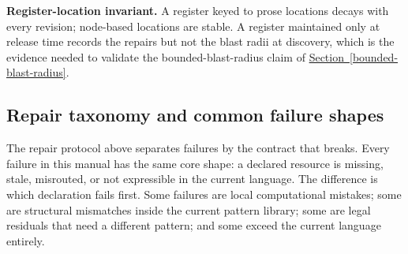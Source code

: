 \documentclass[
  11pt,
]{article}
\theoremstyle{definition}
\newcommand{\secref}[1]{\hyperref[#1]{Section~\ref*{#1}}}
\begin{document}
\textbf{Register-location invariant.} A register keyed to prose
locations decays with every revision; node-based locations are stable. A
register maintained only at release time records the repairs but not the
blast radii at discovery, which is the evidence needed to validate the
bounded-blast-radius claim of \secref{bounded-blast-radius}.



\subsection{Repair taxonomy and common failure shapes}\label{repair-taxonomy-and-common-failure-shapes}

The repair protocol above separates failures by the contract that breaks.
Every failure in this manual has the same core shape: a declared resource
is missing, stale, misrouted, or not expressible in the current language.
The difference is which declaration fails first. Some failures are local
computational mistakes; some are structural mismatches inside the current
pattern library; some are legal residuals that need a different pattern;
and some exceed the current language entirely.
\end{document}

